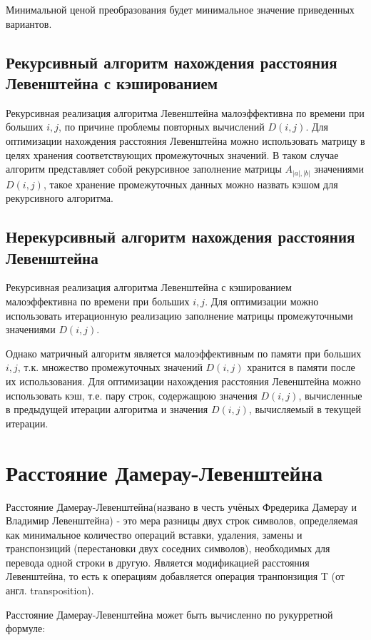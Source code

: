 \documentclass[a4paper,14pt, unknownkeysallowed]{bmstu}
\begin{document}
    Минимальной ценой преобразования будет минимальное значение приведенных вариантов.

    \subsection{Рекурсивный алгоритм нахождения расстояния Левенштейна с кэшированием}

    Рекурсивная реализация алгоритма Левенштейна малоэффективна по времени при больших $i, j$, по причине проблемы повторных вычислений $D(i,j)$. Для оптимизации нахождения расстояния Левенштейна можно использовать матрицу в целях хранения соответствующих промежуточных значений. В таком случае алгоритм представляет собой рекурсивное заполнение матрицы $A_{|a|,|b|}$ значениями $D(i,j)$, такое хранение промежуточных данных можно назвать кэшом для рекурсивного алгоритма.

    \subsection{Нерекурсивный алгоритм нахождения расстояния Левенштейна}

    Рекурсивная реализация алгоритма Левенштейна с кэшированием малоэффективна по времени при больших $i, j$. Для оптимизации можно использовать итерационную реализацию заполнение матрицы промежуточными значениями $D(i,j)$.

    Однако матричный алгоритм является малоэффективным по памяти при больших $i, j$, т.к. множество промежуточных значений $D(i,j)$ хранится в памяти после их использования. Для оптимизации нахождения расстояния Левенштейна можно использовать кэш, т.е. пару строк, содержащюю значения $D(i,j)$, вычисленные в предыдущей итерации алгоритма и значения $D(i,j)$, вычисляемый в текущей итерации.

	\section{Расстояние Дамерау-Левенштейна}
	Расстояние Дамерау-Левенштейна(названо в честь учёных Фредерика Дамерау и Владимир Левенштейна) - это мера разницы двух строк символов, определяемая как минимальное количество операций вставки, удаления, замены и транспонзиций (перестановки двух соседних символов), необходимых для перевода одной строки в другую. Является модификацией расстояния Левенштейна, то есть к операциям добавляется операция транпонзиция T (от англ. transposition).

	Расстояние Дамерау-Левенштейна может быть вычисленно по рукурретной формуле:
\end{document}
